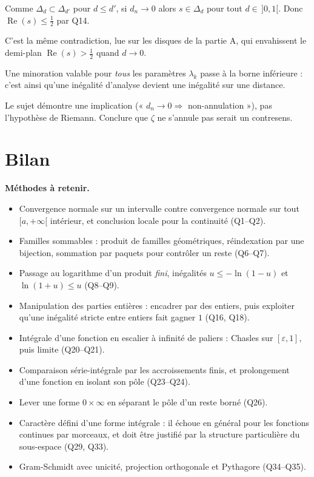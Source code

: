 \documentclass[11pt,a4paper]{article}
\providecommand{\tightlist}{\setlength{\itemsep}{0pt}\setlength{\parskip}{0pt}}
\begin{document}
Comme \(\Delta_d\subset\Delta_{d'}\) pour \(d\leqslant d'\), si \(d_n\to0\) alors \(s\in\Delta_d\) pour tout \(d\in\,]0,1[\). Donc \(\operatorname{Re}(s)\leqslant\frac12\) par Q14.

C'est la même contradiction, lue sur les disques de la partie A, qui envahissent le demi-plan \(\operatorname{Re}(s)>\frac12\) quand \(d\to0\).

\begin{methode}

Une minoration valable pour \emph{tous} les paramètres \(\lambda_k\) passe à la borne inférieure : c'est ainsi qu'une inégalité d'analyse devient une inégalité sur une distance.

\end{methode}

\begin{piege}

Le sujet démontre une implication (« \(d_n\to0\Rightarrow\) non-annulation »), pas l'hypothèse de Riemann. Conclure que \(\zeta\) ne s'annule pas serait un contresens.

\end{piege}

\hypertarget{bilan}{%
\section{Bilan}\label{bilan}}

\textbf{Méthodes à retenir.}

\begin{itemize}
\tightlist
\item
  Convergence normale sur un intervalle contre convergence normale sur tout \([a,+\infty[\) intérieur, et conclusion locale pour la continuité (Q1--Q2).
\item
  Familles sommables : produit de familles géométriques, réindexation par une bijection, sommation par paquets pour contrôler un reste (Q6--Q7).
\item
  Passage au logarithme d'un produit \emph{fini}, inégalités \(u\leqslant-\ln(1-u)\) et \(\ln(1+u)\leqslant u\) (Q8--Q9).
\item
  Manipulation des parties entières : encadrer par des entiers, puis exploiter qu'une inégalité stricte entre entiers fait gagner \(1\) (Q16, Q18).
\item
  Intégrale d'une fonction en escalier à infinité de paliers : Chasles sur \([\varepsilon,1]\), puis limite (Q20--Q21).
\item
  Comparaison série-intégrale par les accroissements finis, et prolongement d'une fonction en isolant son pôle (Q23--Q24).
\item
  Lever une forme \(0\times\infty\) en séparant le pôle d'un reste borné (Q26).
\item
  Caractère défini d'une forme intégrale : il échoue en général pour les fonctions continues par morceaux, et doit être justifié par la structure particulière du sous-espace (Q29, Q33).
\item
  Gram-Schmidt avec unicité, projection orthogonale et Pythagore (Q34--Q35).
\end{itemize}
\end{document}
